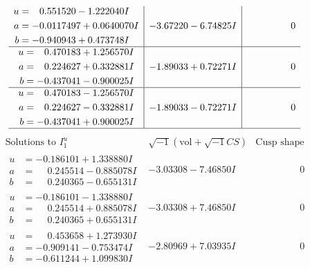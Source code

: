 \documentclass[1p]{elsarticle_modified}
\theoremstyle{definition}
\newcommand{\I}{\sqrt{-1}}
\begin{document}
$$\begin{array}{c|c|c}
\begin{aligned}
u &= \phantom{-}0.551520 - 1.222040 I \\
a &= -0.0117497 + 0.0640070 I \\
b &= -0.940943 + 0.473748 I\end{aligned}
 & -3.67220 - 6.74825 I & \phantom{-0.000000 } 0 \\ \hline\begin{aligned}
u &= \phantom{-}0.470183 + 1.256570 I \\
a &= \phantom{-}0.224627 + 0.332881 I \\
b &= -0.437041 - 0.900025 I\end{aligned}
 & -1.89033 + 0.72271 I & \phantom{-0.000000 } 0 \\ \hline\begin{aligned}
u &= \phantom{-}0.470183 - 1.256570 I \\
a &= \phantom{-}0.224627 - 0.332881 I \\
b &= -0.437041 + 0.900025 I\end{aligned}
 & -1.89033 - 0.72271 I & \phantom{-0.000000 } 0\\
 \hline 
 \end{array}$$\newpage$$\begin{array}{c|c|c}  
\text{Solutions to }I^u_{1}& \I (\text{vol} + \sqrt{-1}CS) & \text{Cusp shape}\\
 \hline 
\begin{aligned}
u &= -0.186101 + 1.338880 I \\
a &= \phantom{-}0.245514 - 0.885078 I \\
b &= \phantom{-}0.240365 - 0.655131 I\end{aligned}
 & -3.03308 - 7.46850 I & \phantom{-0.000000 } 0 \\ \hline\begin{aligned}
u &= -0.186101 - 1.338880 I \\
a &= \phantom{-}0.245514 + 0.885078 I \\
b &= \phantom{-}0.240365 + 0.655131 I\end{aligned}
 & -3.03308 + 7.46850 I & \phantom{-0.000000 } 0 \\ \hline\begin{aligned}
u &= \phantom{-}0.453658 + 1.273930 I \\
a &= -0.909141 - 0.753474 I \\
b &= -0.611244 + 1.099830 I\end{aligned}
 & -2.80969 + 7.03935 I & \phantom{-0.000000 } 0 \\ \hline\begin{aligned}

\end{aligned}
\end{array}$$
\end{document}
